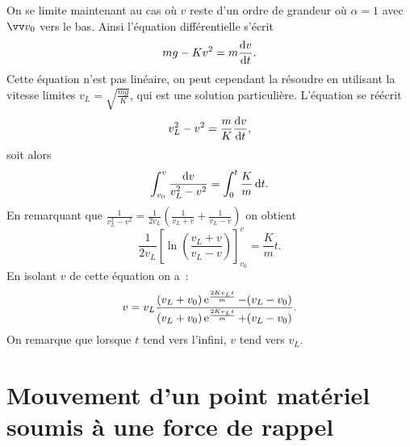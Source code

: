 On se limite maintenant au cas où \(v\) reste d'un ordre de grandeur où 
\(\alpha=1\) avec \(\vvv_0\) vers le bas. Ainsi l'équation différentielle 
s'écrit
\begin{equation}%
  mg -Kv^2 = m\derived{v}{t}.
\end{equation}%
Cette équation n'est pas linéaire, on peut cependant la résoudre en utilisant 
la vitesse limites \(v_L = \sqrt{\frac{mg}{K}}\), qui est une solution 
particulière. L'équation se réécrit
\begin{equation}%
  v_L^2-v^2 = \frac{m}{K}\derived{v}{t},
\end{equation}%
soit alors
\begin{equation}%
  \int_{v_0}^v \frac{\diff v}{v_L^2-v^2} = \int_0^t\frac{K}{m}\diff t.
\end{equation}%
En remarquant que \(\frac{1}{v_L^2-v^2} = \frac{1}{2 
v_L}\left(\frac{1}{v_L+v}+\frac{1}{v_L-v}\right)\) on obtient
\begin{equation}%
  \frac{1}{2v_L}\left[\ln\left(\frac{v_L+v}{v_L-v}\right)\right]^{v}_{v_0} = 
  \frac{K}{m}t.
\end{equation}%
En isolant \(v\) de cette équation on a~:
\begin{equation}%
  v = v_L \frac{(v_L+v_0)\e^{\frac{2K v_L 
  t}{m}}-(v_L-v_0)}{(v_L+v_0)\e^{\frac{2K v_L t}{m}}+(v_L-v_0)}.
\end{equation}%
On remarque que lorsque \(t\) tend vers l'infini, \(v\) tend vers \(v_L\).
\section{Mouvement d'un point matériel soumis à une force de rappel}%
\label{chap3-sec:mouvementdunpointmaterielsoumisauneforcederappel}%
